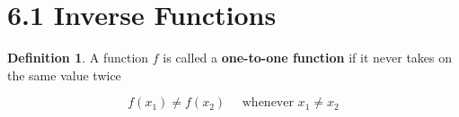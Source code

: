 %
%

\section*{6.1 Inverse Functions}

\theoremstyle{definition}
\newtheorem{defn}{Definition}

\begin{defn}
A function \(f\) is called a \textbf{one-to-one function} if it never takes on the same value twice

\[ f(x_1) \neq f(x_2) \quad \text{ whenever } x_1 \neq x_2 \]

\end{defn}
  
